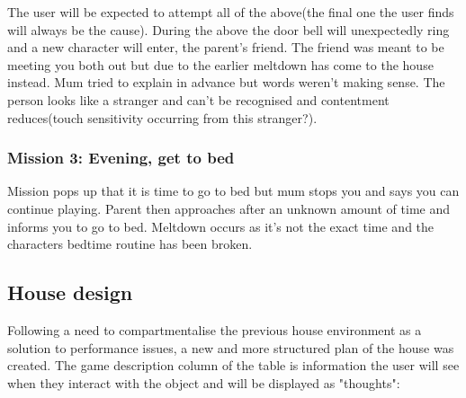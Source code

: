 \documentclass[11pt]{report}
\begin{document}
The user will be expected to attempt all of the above(the final one the user finds will always be the cause). During the above the door bell will unexpectedly ring and a new character will enter, the parent's friend. The friend was meant to be meeting you both out but due to the earlier meltdown has come to the house instead. Mum tried to explain in advance but words weren't making sense. The person looks like a stranger and can't be recognised and contentment reduces(touch sensitivity occurring from this stranger?). 

\subsubsection*{Mission 3: Evening, get to bed}
Mission pops up that it is time to go to bed but mum stops you and says you can continue playing. Parent then approaches after an unknown amount of time and informs you to go to bed. Meltdown occurs as it's not the exact time and the characters bedtime routine has been broken.

\subsection{House design}
Following a need to compartmentalise the previous house environment as a solution to performance issues, a new and more structured plan of the house was created. The game description column of the table is information the user will see when they interact with the object and will be displayed as "thoughts":
\end{document}
